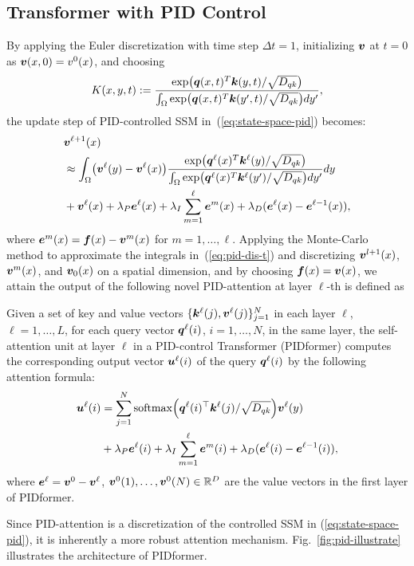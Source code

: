 \subsection{Transformer with PID Control}
By applying the Euler discretization with time step $\Delta t = 1$, initializing ${\bm v}$ at $t = 0$ as ${\bm v}(x, 0) = v^0(x)$, and choosing 
\[
K(x,y, t):= \frac{\exp\bigl({\bm q}(x, t)^{T}{\bm k}(y, t)/\sqrt{D_{qk}}\bigl)}{\int_{\Omega}\exp\bigl({\bm q}(x, t)^{T}{\bm k}(y', t)/\sqrt{D_{qk}}\bigl)dy'},
\]
the update step of PID-controlled SSM in~(\ref{eq:state-space-pid}) becomes:
\begin{equation}
  \begin{aligned}
\label{eq:pid-dis-t}
    &{\bm v}^{\ell + 1}(x) \\
    &\approx  \int_{\Omega} \bigl(\bm{v}^{\ell}(y) - \bm{v}^{\ell}(x) \bigl)\displaystyle\frac{\exp\bigl({\bm q}^{\ell}(x)^{T}{\bm k}^{\ell}(y)/\sqrt{D_{qk}}\bigl)}{\int_{\Omega}\exp\bigl({\bm q}^{\ell}(x)^{T}{\bm k}^{\ell}(y')/\sqrt{D_{qk}}\bigl)dy'}dy \\
    &+ {\bm v}^{\ell}(x) + \lambda_P \bm{e}^{\ell}(x) + \lambda_I \sum_{m = 1}^{\ell} \bm{e}^m(x) + \lambda_D(\bm{e}^{\ell}(x) - \bm{e}^{\ell - 1}(x)),
\end{aligned}  
\end{equation}
where $\bm{e}^m(x) = {\bm f}(x) - {\bm v}^m(x)$ for $m = 1,\dots, \ell$. 
Applying the Monte-Carlo method to approximate the integrals in~(\ref{eq:pid-dis-t}) and discretizing ${\bm v}^{l + 1}(x)$, ${\bm v}^m(x)$, and ${\bm v}_0(x)$ on a spatial dimension, and by choosing ${\bm f}(x) = {\bm v}(x)$, we attain the output of the following novel PID-attention at layer $\ell$-th is defined as
\begin{definition}
\label{def:pid-attn}
Given a set of key and value vectors $\{{\bm k}^{\ell}(j),{\bm v}^{\ell}(j)\}_{j=1}^{N}$ in each layer $\ell$, $\ell=1,\dots,L$, for each query vector ${\bm q}^{\ell}(i)$, $i=1,\dots,N$, in the same layer, the self-attention unit at layer $\ell$ in a PID-control Transformer (PIDformer) computes the corresponding output vector ${\bm u}^{\ell}(i)$ of the query ${\bm q}^{\ell}(i)$ by the following attention formula:
\begin{equation}
   \begin{aligned}
    {\bm u}^{\ell}(i)  
    &=\sum_{j = 1}^N {\rm softmax}\Big({{\bm q}}^{\ell}(i)^\top{{\bm k}}^{\ell}(j)/\sqrt{D_{qk}}\Big)\bm{v}^{\ell}(y) \\
    &+ \lambda_P \bm{e}^{\ell}(i) + \lambda_I \sum_{m = 1}^{\ell} \bm{e}^{m}(i) + \lambda_D(\bm{e}^{\ell}(i) - \bm{e}^{\ell - 1}(i)),
\end{aligned} 
\end{equation}
where $\bm{e}^{\ell} = {\bm v}^0 - {\bm v}^{\ell}$, ${\bm v}^{0}(1),\dots, {\bm v}^{0}(N)\in {\mathbb{R}}^{D}$ are the value vectors in the first layer of PIDformer. 
\end{definition}
Since PID-attention is a discretization of the controlled SSM in (\ref{eq:state-space-pid}), it is inherently a more robust attention mechanism.
Fig.~\ref{fig:pid-illustrate} illustrates the architecture of PIDformer.

